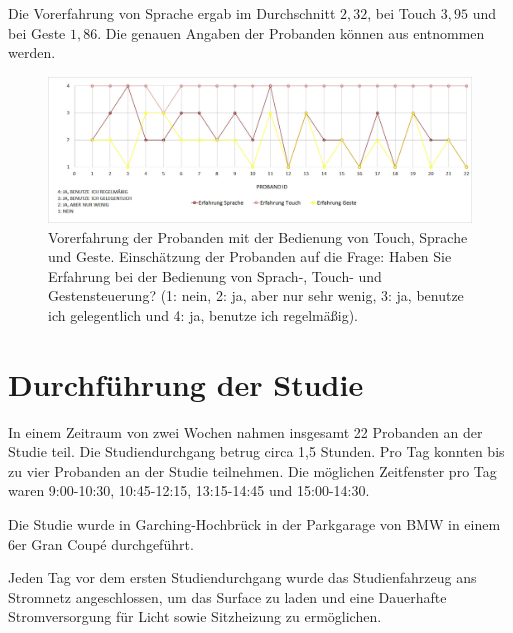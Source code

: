 Die Vorerfahrung von Sprache ergab im Durchschnitt $2,32$, bei Touch $3,95$ und bei Geste $1,86$. Die genauen Angaben der Probanden können aus  entnommen werden.
\begin{figure}[ht]
  \centering
  \includegraphics[width=1\textwidth]{img/ErfahrungProbanden2.jpg}
  \caption[Vorerfahrung der Probanden]{Vorerfahrung der Probanden mit der Bedienung von Touch, Sprache und Geste. Einschätzung der Probanden auf die Frage: Haben Sie Erfahrung bei der Bedienung von Sprach-, Touch- und Gestensteuerung? (1: nein, 2: ja, aber nur sehr wenig, 3: ja, benutze ich gelegentlich und 4: ja, benutze ich regelmäßig). 
}
  \label{fig:Vorerfahrung}
\end{figure}
\section{Durchführung der Studie}
In einem Zeitraum von zwei Wochen nahmen insgesamt 22 Probanden an der Studie teil. 
Die Studiendurchgang betrug circa 1,5 Stunden. Pro Tag konnten bis zu vier Probanden an der Studie teilnehmen. 
Die möglichen Zeitfenster pro Tag waren 9:00-10:30, 10:45-12:15, 13:15-14:45 und 15:00-14:30. 

Die Studie wurde in Garching-Hochbrück in der Parkgarage von BMW in einem 6er Gran Coupé durchgeführt. 

Jeden Tag vor dem ersten Studiendurchgang wurde das Studienfahrzeug ans Stromnetz angeschlossen, um das Surface zu laden und eine Dauerhafte Stromversorgung für Licht sowie Sitzheizung zu ermöglichen.


